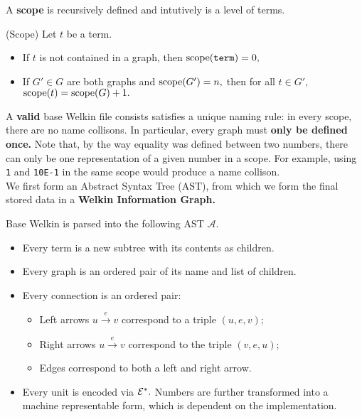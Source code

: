 A \textbf{scope} is recursively defined and intutively is a level of terms.
\begin{definition} (Scope)
 Let $t$ be a term.
  \begin{itemize}
	\item If $t$ is not contained in a graph, then $\textrm{scope}(\texttt{term}) = 0,$
	\item If $G' \in G$ are both graphs and $\textrm{scope}(G') = n,$ then for all $t \in G',$ $\textrm{scope}(t) = \textrm{scope}(G) + 1.$
\end{itemize}
\end{definition}
A \textbf{valid} base Welkin file consists satisfies a unique naming rule: in every scope, there are no name collisons. In particular, every graph must \textbf{only be defined once.} Note that, by the way equality was defined between two numbers,
  there can only be one representation of a given number in a scope. For example, using \texttt{1} and \texttt{10E-1} in the same scope would produce a name collison.
\\ We first form an Abstract Syntax Tree (AST), from which we form the final stored data in a \textbf{Welkin Information Graph.}
\begin{definition}
  Base Welkin is parsed into the following AST $\mathcal{A}.$
  \begin{itemize}
	\item Every term is a new subtree with its contents as children.
    \item Every graph is an ordered pair of its name and list of children.
    \item Every connection is an ordered pair:
		  \begin{itemize}
			\item Left arrows $u \xrightarrow{e} v$ correspond to a triple $(u, e, v);$
			\item Right arrows $u \xrightarrow{e} v$ correspond to the triple $(v, e, u);$
			\item Edges correspond to both a left and right arrow.
		  \end{itemize}
	\item Every unit is encoded via $\mathcal{E}^{*}.$ Numbers are further transformed into a machine representable form, which is dependent on the implementation.
  \end{itemize}
 \end{definition}

